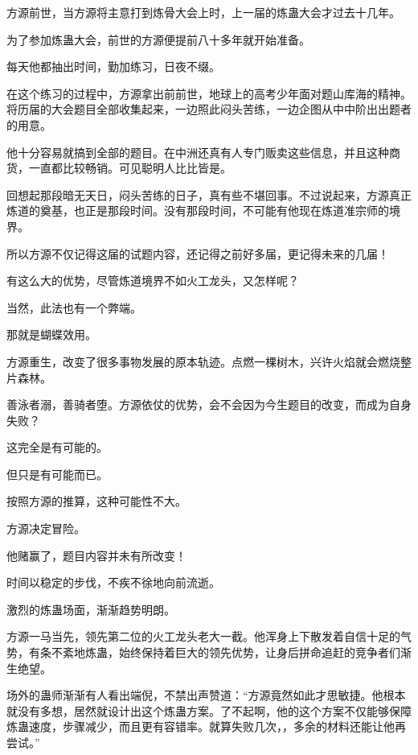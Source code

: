 
\begin{this_body}

方源前世，当方源将主意打到炼骨大会上时，上一届的炼蛊大会才过去十几年。

为了参加炼蛊大会，前世的方源便提前八十多年就开始准备。

每天他都抽出时间，勤加练习，日夜不缀。

在这个练习的过程中，方源拿出前前世，地球上的高考少年面对题山库海的精神。将历届的大会题目全部收集起来，一边照此闷头苦练，一边企图从中中阶出出题者的用意。

他十分容易就搞到全部的题目。在中洲还真有人专门贩卖这些信息，并且这种商货，一直都比较畅销。可见聪明人比比皆是。

回想起那段暗无天日，闷头苦练的日子，真有些不堪回事。不过说起来，方源真正炼道的奠基，也正是那段时间。没有那段时间，不可能有他现在炼道准宗师的境界。

所以方源不仅记得这届的试题内容，还记得之前好多届，更记得未来的几届！

有这么大的优势，尽管炼道境界不如火工龙头，又怎样呢？

当然，此法也有一个弊端。

那就是蝴蝶效用。

方源重生，改变了很多事物发展的原本轨迹。点燃一棵树木，兴许火焰就会燃烧整片森林。

善泳者溺，善骑者堕。方源依仗的优势，会不会因为今生题目的改变，而成为自身失败？

这完全是有可能的。

但只是有可能而已。

按照方源的推算，这种可能性不大。

方源决定冒险。

他赌赢了，题目内容并未有所改变！

时间以稳定的步伐，不疾不徐地向前流逝。

激烈的炼蛊场面，渐渐趋势明朗。

方源一马当先，领先第二位的火工龙头老大一截。他浑身上下散发着自信十足的气势，有条不紊地炼蛊，始终保持着巨大的领先优势，让身后拼命追赶的竞争者们渐生绝望。

场外的蛊师渐渐有人看出端倪，不禁出声赞道：“方源竟然如此才思敏捷。他根本就没有多想，居然就设计出这个炼蛊方案。了不起啊，他的这个方案不仅能够保障炼蛊速度，步骤减少，而且更有容错率。就算失败几次，，多余的材料还能让他再尝试。”


\end{this_body}
